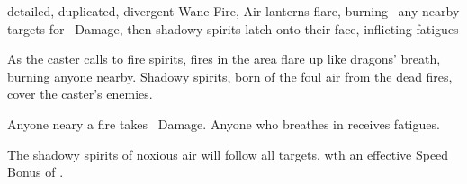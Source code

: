   {detailed, duplicated, divergent}%
  {Wane}%
  {Fire, Air}%
  {}%
  {lanterns flare, burning \spellArea\ any nearby targets for \showDam\ Damage, then shadowy spirits latch onto their face, inflicting  \glspl{fatigue}}%
  {
    As the caster calls to fire spirits, fires in the area flare up like dragons' breath, burning anyone nearby.
    Shadowy spirits, born of the foul air from the dead fires, cover the caster's enemies.

    Anyone neary a fire takes \showDam\ Damage.
    Anyone who breathes in receives  \glspl{fatigue}.

    The shadowy spirits of noxious air will follow all targets, wth an effective Speed Bonus of .
  }

